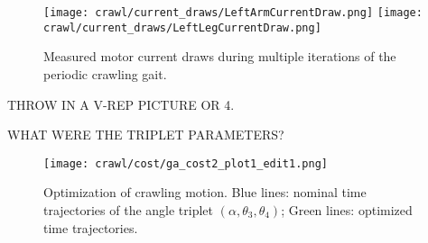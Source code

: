 \begin{figure}
  \centerline{
    \texttt{[image: crawl/current\_draws/LeftArmCurrentDraw.png]}
    \texttt{[image: crawl/current\_draws/LeftLegCurrentDraw.png]}
  }
  \vspace*{-0.03in}
  \caption{Measured motor current draws during multiple iterations of the periodic crawling gait.}
  \label{fig:nao_currents}
  \vspace*{-0.23in}
\end{figure}


THROW IN A V-REP PICTURE OR 4.


WHAT WERE THE TRIPLET PARAMETERS?

\begin{figure}
  \vspace*{-0.12in}
  \centerline{
    \texttt{[image: crawl/cost/ga\_cost2\_plot1\_edit1.png]}
  }
  \vspace*{-0.15in}
  \caption{Optimization of crawling motion. Blue lines: nominal time trajectories of the angle triplet 
           $(\alpha,\theta_3,\theta_4)$; Green lines: optimized time trajectories. }
  \vspace*{-0.17in}
  \label{fig:optimal}
\end{figure}

